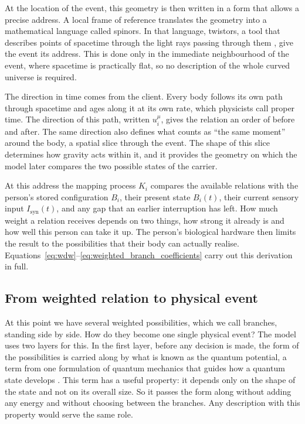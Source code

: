 At the location of the event, this geometry is then written in a form that allows a
precise address. A local frame of reference translates the geometry into a
mathematical language called spinors. In that language, twistors, a tool that
describes points of spacetime through the light rays passing through them
\citep{penrose1967}, give the event its address. This is done only in the immediate
neighbourhood of the event, where spacetime is practically flat, so no description of
the whole curved universe is required.

The direction in time comes from the client. Every body follows its own path through
spacetime and ages along it at its own rate, which physicists call proper time. The
direction of this path, written $u_i^\mu$, gives the relation an order of before and
after. The same direction also defines what counts as ``the same moment'' around the
body, a spatial slice through the event. The shape of this slice determines how
gravity acts within it, and it provides the geometry on which the model later compares
the two possible states of the carrier.

At this address the mapping process $K_i$ compares the available relations with the
person's stored configuration $B_i$, their present state $B_i(t)$, their current
sensory input $I_{\mathrm{syn}}(t)$, and any gap that an earlier interruption has left.
How much weight a relation receives depends on two things, how strong it already is
and how well this person can take it up. The person's biological hardware then limits
the result to the possibilities that their body can actually realise.
Equations~\eqref{eq:wdw}--\eqref{eq:weighted_branch_coefficients} carry out this
derivation in full.

\subsection{From weighted relation to physical event}

At this point we have several weighted possibilities, which we call branches,
standing side by side. How do they become one single physical event? The model uses
two layers for this. In the first layer, before any decision is made, the form of the
possibilities is carried along by what is known as the quantum potential, a term from
one formulation of quantum mechanics that guides how a quantum state develops
\citep{bohm1952a}. This term has a useful property: it depends only on the shape of
the state and not on its overall size. So it passes the form along without
adding any energy and without choosing between the branches. Any description with
this property would serve the same role.

